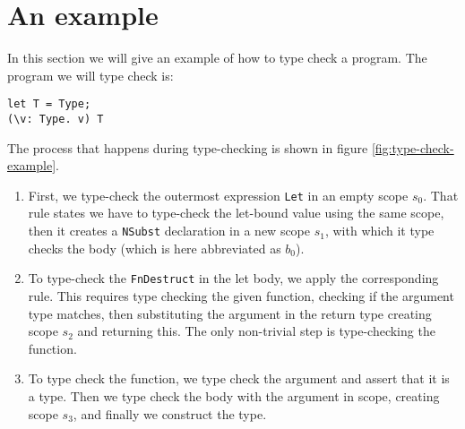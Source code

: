 \section{An example}
In this section we will give an example of how to type check a program. The program we will type check is:
\begin{lstlisting}
let T = Type;
(\v: Type. v) T
\end{lstlisting}
The process that happens during type-checking is shown in figure \ref{fig:type-check-example}.
\begin{enumerate}
	\item First, we type-check the outermost expression \verb|Let| in an empty scope $s_0$. That rule states we have to type-check the let-bound value using the same scope, then it creates a \verb|NSubst| declaration in a new scope $s_1$, with which it type checks the body (which is here abbreviated as $b_0$).
	\item To type-check the \verb|FnDestruct| in the let body, we apply the corresponding rule. This requires type checking the given function, checking if the argument type matches, then substituting the argument in the return type creating scope $s_2$ and returning this. The only non-trivial step is type-checking the function.
	\item To type check the function, we type check the argument and assert that it is a type. Then we type check the body with the argument in scope, creating scope $s_3$, and finally we construct the type. 
\end{enumerate}

